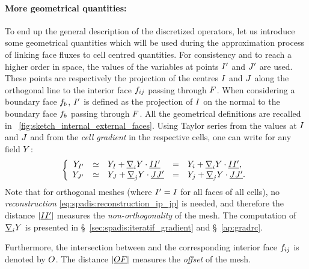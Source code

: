  \paragraph{More geometrical quantities:}
To end up the general description of the discretized operators, let us introduce some geometrical
quantities which will be used during the approximation process of linking face fluxes to
cell centred quantities.
For consistency and to reach a higher order in space, the values of the
variables at points $\centip$ and $\centjp$ are used.
These points are respectively the projection of the centres $\centi$ and $\centj$
along the orthogonal line to the interior face $\fij$ passing through $\centf$.
When considering a boundary face $\fib$, $\centip$ is defined as the projection of $\centi$
on the normal to the boundary face $\fib$ passing through $\centf$. All the geometrical
definitions are recalled in \figurename~\ref{fig:sketch_internal_external_faces}.
%
Using Taylor series from the values at $\centi$ and $\centj$ and from the \emph{cell gradient}
in the respective cells, one can write for any field $\varia$:
\begin{equation}\label{eq:spadis:reconstruction_ip_jp}
\left\lbrace
\begin{array}{r c l c l}
\varia_\centip &\simeq & \varia_\centi + \grad_\celli \varia \cdot \vect{\centi \centip} &=& \varia_\celli + \grad_\celli \varia \cdot \vect{\centi \centip},  \\
\varia_\centjp &\simeq & \varia_\centj + \grad_\cellj \varia \cdot \vect{\centj \centjp} & =& \varia_\cellj + \grad_\cellj \varia \cdot \vect{\centj \centjp}.
\end{array}
\right.
\end{equation}
Note that for orthogonal meshes (where $\centip = \centi$ for all faces of all cells),
no \emph{reconstruction} \eqref{eq:spadis:reconstruction_ip_jp} is needed,
and therefore the distance $\norm{\vect{\centi \centip}}$ measures the \emph{non-orthogonality} of the mesh.
The computation of $\grad_\celli \varia$ is presented in  \S~\ref{sec:spadis:iteratif_gradient} and \S~\ref{ap:gradrc}.

Furthermore, the intersection between \vect{\centi \centj} and the corresponding interior face $\fij$ is denoted by $\cento$.
The distance $\norm{\vect{\cento \centf}}$ measures the \emph{offset} of the mesh.


